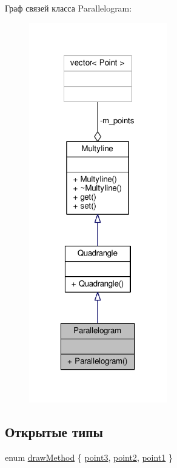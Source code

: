 Граф связей класса Parallelogram\-:
\nopagebreak
\begin{figure}[H]
\begin{center}
\leavevmode
\includegraphics[width=171pt]{class_parallelogram__coll__graph}
\end{center}
\end{figure}
\subsection*{Открытые типы}
\begin{DoxyCompactItemize}
\item 
enum \hyperlink{class_parallelogram_aeae756ed193db05daf0aeb3d0a0966b0}{draw\-Method} \{ \hyperlink{class_parallelogram_aeae756ed193db05daf0aeb3d0a0966b0a8da001730608d2059c34abe87159e366}{point3}, 
\hyperlink{class_parallelogram_aeae756ed193db05daf0aeb3d0a0966b0a1120a1b801f1081028e8345091b6c0b6}{point2}, 
\hyperlink{class_parallelogram_aeae756ed193db05daf0aeb3d0a0966b0a1038e30d507cb7f800b0b3698312be0e}{point1}
 \}
\end{DoxyCompactItemize}
